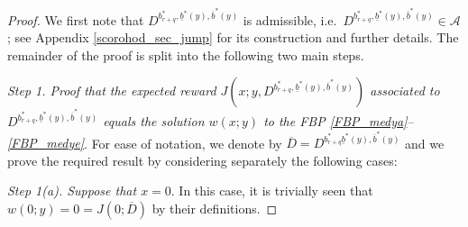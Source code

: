 \documentclass[11pt]{article} %
\newcommand{\ubar}[1]{\underaccent{\bar}{#1}}
\numberwithin{komcounter}{section}
\renewcommand{\ubar}{\underline}
\renewcommand{\bar}{\overline}
\numberwithin{equation}{section}
\numberwithin{theorem}{section}
\begin{document}
\begin{proof}
We first note that $D^{b_{r+q}^*,\ubar{b}^*(y),\bar{b}^*(y)}$ is admissible, i.e.~$D^{b_{r+q}^*,\ubar{b}^*(y),\bar{b}^*(y)} \in \mathcal{A}$; see Appendix \ref{scorohod_sec_jump} for its construction and further details. 
The remainder of the proof is split into the following two main steps. 

\vspace{1mm}
{\it Step 1. Proof that the expected reward $J(x;y,D^{b_{r+q}^*,\ubar{b}^*(y),\bar{b}^*(y)})$ associated to $D^{b_{r+q}^*,\ubar{b}^*(y),\bar{b}^*(y)}$ equals the solution $w(x;y)$ to the FBP \eqref{FBP_medya}--\eqref{FBP_medye}}.
For ease of notation, we denote by $\bar{D} = D^{b_{r+q}^*\ubar{b}^*(y),\bar{b}^*(y)}$ and we prove the required result by considering separately the following cases:

\vspace{1mm}
{\it Step 1(a). Suppose that $x=0$}.
In this case, it is trivially seen that $w(0;y)=0=J(0;\bar{D})$ by their definitions. 


\end{proof}
\end{document}

